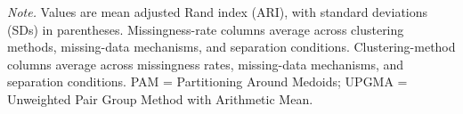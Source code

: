 \vspace{0.5em}

\noindent\textit{Note.} Values are mean adjusted Rand index (ARI), with standard deviations (SDs) in parentheses. Missingness-rate columns average across clustering methods, missing-data mechanisms, and separation conditions. Clustering-method columns average across missingness rates, missing-data mechanisms, and separation conditions. PAM = Partitioning Around Medoids; UPGMA = Unweighted Pair Group Method with Arithmetic Mean.

\endgroup